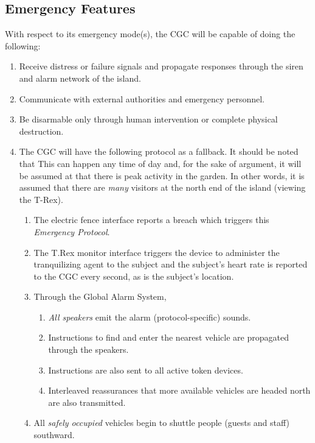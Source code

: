 \documentclass[12pt]{article}
\begin{document}
    \subsection{Emergency Features}
    With respect to its emergency mode(s), the CGC will be capable of doing the following:
    \begin{enumerate}
        \item Receive distress or failure signals and propagate responses through the siren and 
        alarm network of the island. 
        \item Communicate with external authorities and emergency personnel.
        \item Be disarmable only through human intervention or complete physical destruction.
        \item The CGC will have the following protocol as a fallback. It should be noted that This can happen 
        any time of day and, for the sake of argument, it will be assumed at that there is peak activity in the garden. 
        In other words, it is assumed that there are \textit{many} visitors at the north end of the island (viewing the T-Rex). 
            \begin{enumerate}
                \item The electric fence interface reports a breach which triggers this \textit{Emergency Protocol}.
                \item The T.Rex monitor interface triggers the device to administer the tranquilizing agent to the subject
                and the subject's heart rate is reported to the CGC every second, as is the subject's location.
                \item Through the Global Alarm System,
                    \begin{enumerate}
                        \item \textit{All speakers} emit the alarm (protocol-specific) sounds.
                        \item Instructions to find and enter the nearest vehicle are propagated through the speakers. 
                        \item Instructions are also sent to all active token devices.
                        \item Interleaved reassurances that more available vehicles are headed north are also transmitted. 
                    \end{enumerate}
                \item{\label{activecars} All \textit{safely occupied} vehicles begin to shuttle people (guests and staff) southward.}

\end{enumerate}
\end{enumerate}
\end{document}
